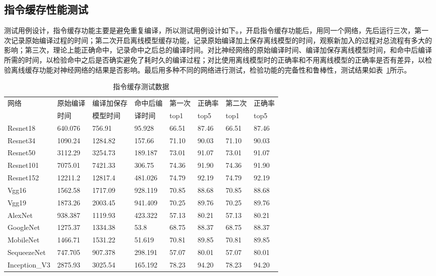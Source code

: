 \subsection {指令缓存性能测试}
测试用例设计，指令缓存功能主要是避免重复编译，所以测试用例设计如下。，开启指令缓存功能后，用同一个网络，先后运行三次，第一次记录原始编译过程的时间；第二次开启离线模型缓存功能，记录原始编译加上保存离线模型的时间，观察新加入的过程对总流程有多大的影响；第三次，理论上能正确命中，记录命中之后总的编译时间。对比神经网络的原始编译时间、编译加保存离线模型时间，和命中后编译所需的时间，以检验命中之后是否确实避免了耗时久的编译过程；对比使用离线模型时的正确率和不用离线模型的正确率是否有差异，以检验离线缓存功能对神经网络的结果是否影响。最后用多种不同的网络进行测试，检验功能的完备性和鲁棒性，测试结果如表~\ref{tab:experiment-cache-data}所示。

\begin{table}[htb]
  \centering\small
  \caption{指令缓存测试数据}
  \label{tab:experiment-cache-data}
  \begin{tabular}{llllllll}
    \toprule
    网络      & 原始编译 & 编译加保存 &命中后编 & 第一次&正确率 &第二次&正确率 \\
              & 时间    &模型时间    &译时间   & top1 & top5  &top1 & top5   \\
    \midrule
    Resnet18  & 640.076 & 756.91  & 95.928  & 66.51 & 87.46 & 66.51 & 87.46 \\
    Resnet34  & 1090.24 & 1284.82 & 157.66  & 71.10 & 90.03 & 71.10 & 90.03  \\
    Resnet50  & 3112.29 & 3254.73 & 189.187 & 73.01 & 91.07 & 73.01 & 91.07  \\
    Resnet101 & 7075.01 & 7421.33 & 306.75  & 74.36 & 91.90 & 74.36 & 91.90  \\
    Resnet152 & 12211.2 & 12817.4 & 481.026 & 74.79 & 92.19 & 74.79 & 92.19  \\
    Vgg16     & 1562.58 & 1717.09 & 928.119 & 70.85 & 88.68 & 70.85 & 88.68  \\
    Vgg19     & 1873.26 & 2003.45 & 941.409 & 70.25 & 89.76 & 70.25 & 89.76  \\
    AlexNet   & 938.387 & 1119.93 & 423.322 & 57.13 & 80.21 & 57.13 & 80.21  \\
    GoogleNet & 1275.37 & 1334.38 & 53.8    & 68.75 & 88.37 & 68.75 & 88.37  \\
    MobileNet & 1466.71 & 1531.22 & 51.619  & 70.81 & 89.85 & 70.81 & 89.85  \\
    SequeezeNet & 747.705  & 907.378 & 298.191 & 57.07 & 80.01 & 57.07 & 80.01 \\
    Inception\_V3 & 2875.93 & 3025.54 & 165.192 & 78.23 & 94.20 & 78.23 & 94.20  \\
    \bottomrule
  \end{tabular}
\end{table}

